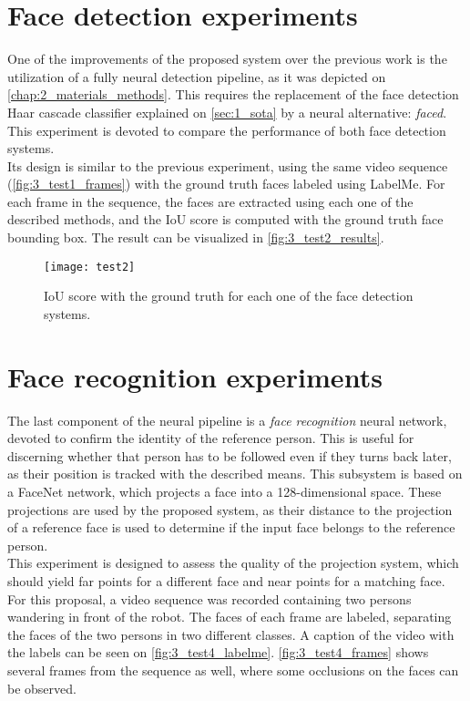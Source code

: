 \section{Face detection experiments}
\label{sec:3_test2}

One of the improvements of the proposed system over the previous work \cite{tfg} is the utilization of a fully neural detection pipeline, as it was depicted on \autoref{chap:2_materials_methods}. This requires the replacement of the face detection Haar cascade classifier explained on \autoref{sec:1_sota} by a neural alternative: \textit{faced}. This experiment is devoted to compare the performance of both face detection systems.\\

Its design is similar to the previous experiment, using the same video sequence (\autoref{fig:3_test1_frames}) with the ground truth faces labeled using LabelMe. For each frame in the sequence, the faces are extracted using each one of the described methods, and the IoU score is computed with the ground truth face bounding box. The result can be visualized in \autoref{fig:3_test2_results}.

\begin{figure}[h]
	\centering
	\texttt{[image: test2]}
	\caption{IoU score with the ground truth for each one of the face detection systems.}
	\label{fig:3_test2_results}
\end{figure}

\section{Face recognition experiments}

\label{sec:3_test4}
The last component of the neural pipeline is a \textit{face recognition} neural network, devoted to confirm the identity of the reference person. This is useful for discerning whether that person has to be followed even if they turns back later, as their position is tracked with the described means. This subsystem is based on a FaceNet \cite{facenet} network, which projects a face into a 128-dimensional space. These projections are used by the proposed system, as their distance to the projection of a reference face is used to determine if the input face belongs to the reference person.\\

This experiment is designed to assess the quality of the projection system, which should yield far points for a different face and near points for a matching face. For this proposal, a video sequence was recorded containing two persons wandering in front of the robot. The faces of each frame are labeled, separating the faces of the two persons in two different classes. A caption of the video with the labels can be seen on \autoref{fig:3_test4_labelme}. \autoref{fig:3_test4_frames} shows several frames from the sequence as well, where some occlusions on the faces can be observed. 

